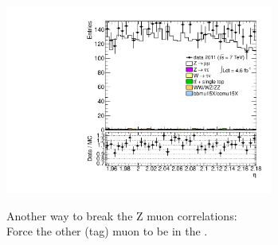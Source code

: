 {\includegraphics[width=0.66\textwidth]{dates/20130306/figures/both/Znjets_10_A_stack_lN_eta_ALL.pdf} 
\cole
}

 {
Another way to break the Z muon correlations: \\
Force the other (tag) muon to be in the .
}

